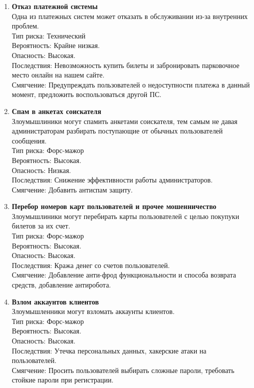 \begin{enumerate}
      \item \textbf{Отказ платежной системы} \\
            Одна из платежных систем может отказать в обслуживании из-за 
            внутренних проблем. \\
            Тип риска: Технический \\
            Вероятность: Крайне низкая. \\
            Опасность: Высокая. \\
            Последствия: Невозможность купить билеты и забронировать 
            парковочное место онлайн на нашем сайте. \\
            Смягчение: Предупреждать пользователей о недоступности платежа в 
            данный момент, предложить воспользоваться другой ПС.
      
      \item \textbf{Спам в анкетах соискателя} \\
            Злоумышлиники могут спамить анкетами соискателя, тем самым
            не давая администраторам разбирать поступающие от обычных 
            пользователей сообщения. \\
            Тип риска: Форс-мажор \\
            Вероятность: Высокая. \\
            Опасность: Низкая. \\
            Последствия: Снижение эффективности работы администраторов. \\
            Смягчение: Добавить антиспам защиту.

      \item \textbf{Перебор номеров карт пользователей и прочее мошенничество} \\
            Злоумышлиники могут перебирать карты пользователей с целью покупуки
            билетов за их счет. \\
            Тип риска: Форс-мажор \\
            Вероятность: Высокая. \\
            Опасность: Высокая. \\
            Последствия: Кража денег со счетов пользователей. \\
            Смягчение: Добавление анти-фрод функциональности и способа возврата средств,
            добавление антиробота. 
      
      \item \textbf{Взлом аккаунтов клиентов} \\
            Злоумышленники могут взломать аккаунты клиентов. \\
            Тип риска: Форс-мажор \\
            Вероятность: Высокая. \\
            Опасность: Высокая. \\
            Последствия: Утечка персональных данных, хакерские атаки на пользователей. \\
            Смягчение: Просить пользователей выбирать сложные пароли, требовать 
            стойкие пароли при регистрации.


\end{enumerate}
